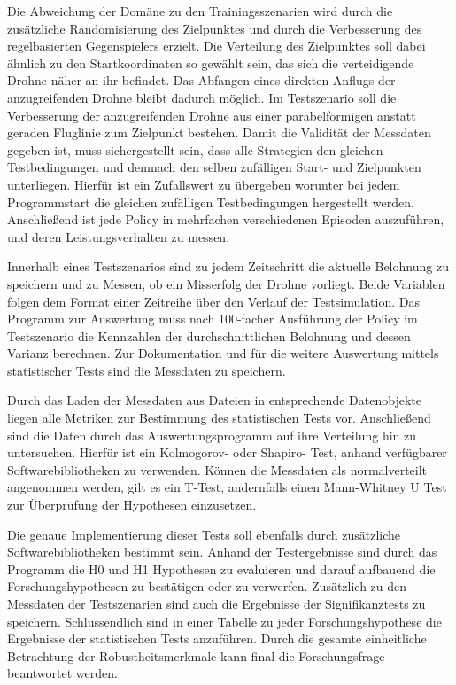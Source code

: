 Die Abweichung der Domäne zu den Trainingsszenarien wird durch die zusätzliche Randomisierung des Zielpunktes und durch die Verbesserung des regelbasierten Gegenspielers erzielt. 
Die Verteilung des Zielpunktes soll dabei ähnlich zu den Startkoordinaten so gewählt sein, das sich die verteidigende Drohne näher an ihr befindet.
Das Abfangen eines direkten Anflugs der anzugreifenden Drohne bleibt dadurch möglich.
Im Testszenario soll die Verbesserung der anzugreifenden Drohne aus einer parabelförmigen anstatt geraden Fluglinie zum Zielpunkt bestehen.
Damit die Validität der Messdaten gegeben ist, muss sichergestellt sein, dass alle Strategien den gleichen Testbedingungen und demnach den selben zufälligen Start- und Zielpunkten unterliegen.
Hierfür ist ein Zufallswert zu übergeben worunter bei jedem Programmstart die gleichen zufälligen Testbedingungen hergestellt werden.
Anschließend ist jede Policy in mehrfachen verschiedenen Episoden auszuführen, und deren Leistungsverhalten zu messen.

Innerhalb eines Testszenarios sind zu jedem Zeitschritt die aktuelle Belohnung zu speichern und zu Messen, ob ein Misserfolg der Drohne vorliegt.
Beide Variablen folgen dem Format einer Zeitreihe über den Verlauf der Testsimulation.
Das Programm zur Auswertung muss nach 100-facher Ausführung der Policy im Testszenario die Kennzahlen der durchschnittlichen Belohnung und dessen Varianz berechnen.
Zur Dokumentation und für die weitere Auswertung mittels statistischer Tests sind die Messdaten zu speichern.

Durch das Laden der Messdaten aus Dateien in entsprechende Datenobjekte liegen alle Metriken zur Bestimmung des statistischen Tests vor.
Anschließend sind die Daten durch das Auswertungsprogramm auf ihre Verteilung hin zu untersuchen.
Hierfür ist ein Kolmogorov- oder Shapiro- Test, anhand verfügbarer Softwarebibliotheken zu verwenden.
Können die Messdaten als normalverteilt angenommen werden, gilt es ein T-Test, andernfalls einen Mann-Whitney U Test zur Überprüfung der Hypothesen einzusetzen.

Die genaue Implementierung dieser Tests soll ebenfalls durch zusätzliche Softwarebibliotheken bestimmt sein.
Anhand der Testergebnisse sind durch das Programm die H0 und H1 Hypothesen zu evaluieren und darauf aufbauend die Forschungshypothesen zu bestätigen oder zu verwerfen.
Zusätzlich zu den Messdaten der Testszenarien sind auch die Ergebnisse der Signifikanztests zu speichern.
Schlussendlich sind in einer Tabelle zu jeder Forschungshypothese die Ergebnisse der statistischen Tests anzuführen.
Durch die gesamte einheitliche Betrachtung der Robustheitsmerkmale kann final die Forschungsfrage beantwortet werden.
